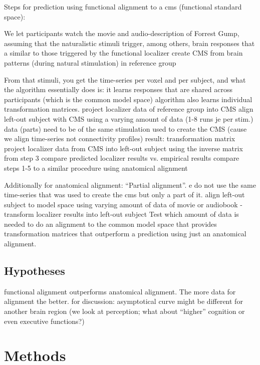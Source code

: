 Steps for prediction using functional alignment to a \ac{cms} (functional
standard space):

%
We let participants watch the movie and audio-description of Forrest Gump,
assuming that the naturalistic stimuli trigger, among others, brain responses
that a similar to those triggered by the functional localizer
%
create CMS from brain patterns (during natural stimulation) in reference group

From that stimuli, you get the time-series per voxel and per subject, and what
the algorithm essentially does is: it learns responses that are shared across
participants (which is the common model space)
%
algorithm also learns individual transformation matrices.
%
project localizer data of reference group into CMS
%
align left-out subject with CMS using a varying amount of data (1-8
%
runs je per stim.) data (parts) need to be of the same stimulation used to
create the CMS (cause we align time-series not connectivity profiles) result:
transformation matrix
%
project localizer data from CMS into left-out subject  using the inverse matrix
from step 3
%
compare predicted localizer results vs. empirical results
%
compare steps 1-5 to a similar procedure using anatomical alignment

%
Additionally for anatomical alignment: ``Partial alignment''.
%
e do not use the same time-series that was used to
create the \ac{cms} but only a part of it.
%
align left-out subject to model space using varying amount of data of
movie or audiobook - transform localizer results into left-out subject
%
Test which amount of data is needed to do an alignment to the common
model space that provides transformation matrices that outperform a prediction
using just an anatomical alignment.

%


\subsection{Hypotheses}
%
functional alignment outperforms anatomical alignment.
%
The more data for alignment the better.
%
for discussion: asymptotical curve might be different for another brain region
(we look at perception; what about ``higher'' cognition or even executive
functions?)


\section{Methods}

